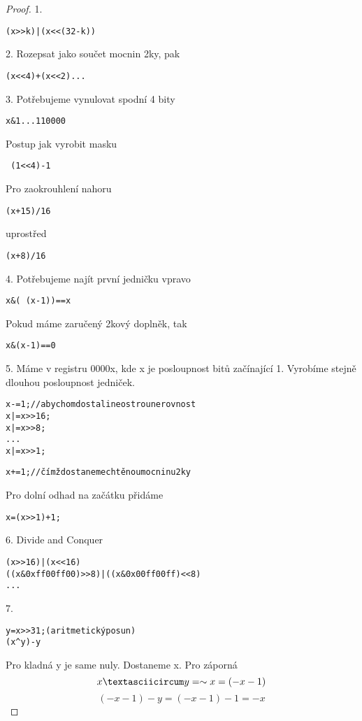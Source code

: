 \begin{proof}
	1.
	\begin{alltt}
		(x >> k) | (x << (32 - k))
	\end{alltt}
	2. Rozepsat jako součet mocnin 2ky, pak
	\begin{alltt}
		(x << 4) + (x << 2) ...
	\end{alltt}
	3. Potřebujeme vynulovat spodní 4 bity
	\begin{alltt}
		x \& 1 ... 110000
	\end{alltt}
	Postup jak vyrobit masku
	\begin{alltt}
		~(1 << 4) - 1
	\end{alltt}

	Pro zaokrouhlení nahoru
	\begin{alltt}
		(x + 15)/16
	\end{alltt}
	uprostřed
	\begin{alltt}
		(x + 8)/16
	\end{alltt}

	4. Potřebujeme najít první jedničku vpravo
	\begin{alltt}
		x \& (~(x - 1)) == x
	\end{alltt}
	Pokud máme zaručený 2kový doplněk, tak
	\begin{alltt}
		x \& (x - 1) == 0
	\end{alltt}

	5. Máme v registru 0000x, kde x je posloupnost bitů začínající 1.
	Vyrobíme stejně dlouhou posloupnost jedniček.
	\begin{alltt}
		x -= 1; //abychom dostali neostrou nerovnost
		x |= x >> 16;
		x |= x >> 8;
		...
		x |= x >> 1;

		x += 1; //čímž dostaneme chtěnou mocninu 2ky
	\end{alltt}

	Pro dolní odhad na začátku přidáme
	\begin{alltt}
		x = (x >> 1) + 1;
	\end{alltt}

	6. Divide and Conquer
	\begin{alltt}
		(x >> 16) | (x << 16)
		((x \& 0xff00ff00) >> 8) | ((x \& 0x00ff00ff) << 8)
		...
	\end{alltt}

	7.
	\begin{alltt}
		y = x >> 31; (aritmetický posun)
		(x ^ y) - y
	\end{alltt}
	Pro kladná y je same nuly. Dostaneme x.
	Pro záporná
	\[ x \textasciicircum y = \sim x = (-x - 1)\]
	\[ (-x - 1) - y = (-x - 1) - 1 = -x \]


\end{proof}
